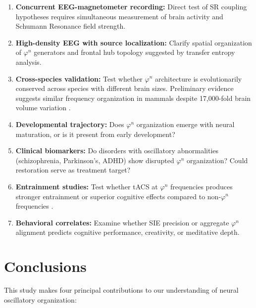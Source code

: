 \documentclass[11pt,a4paper]{article}
\newcommand{\phisym}{\varphi}
\begin{document}
\begin{enumerate}
    \item \textbf{Concurrent EEG-magnetometer recording:} Direct test of SR coupling hypotheses requires simultaneous measurement of brain activity and Schumann Resonance field strength.

    \item \textbf{High-density EEG with source localization:} Clarify spatial organization of $\phisym^n$ generators and frontal hub topology suggested by transfer entropy analysis.

    \item \textbf{Cross-species validation:} Test whether $\phisym^n$ architecture is evolutionarily conserved across species with different brain sizes. Preliminary evidence suggests similar frequency organization in mammals despite 17,000-fold brain volume variation \parencite{buzsaki2013scaling}.

    \item \textbf{Developmental trajectory:} Does $\phisym^n$ organization emerge with neural maturation, or is it present from early development?

    \item \textbf{Clinical biomarkers:} Do disorders with oscillatory abnormalities (schizophrenia, Parkinson's, ADHD) show disrupted $\phisym^n$ organization? Could restoration serve as treatment target?

    \item \textbf{Entrainment studies:} Test whether tACS at $\phisym^n$ frequencies produces stronger entrainment or superior cognitive effects compared to non-$\phisym^n$ frequencies \parencite{herrmann2016eeg}.

    \item \textbf{Behavioral correlates:} Examine whether SIE precision or aggregate $\phisym^n$ alignment predicts cognitive performance, creativity, or meditative depth.
\end{enumerate}

\section{Conclusions}

This study makes four principal contributions to our understanding of neural oscillatory organization:
\end{document}
